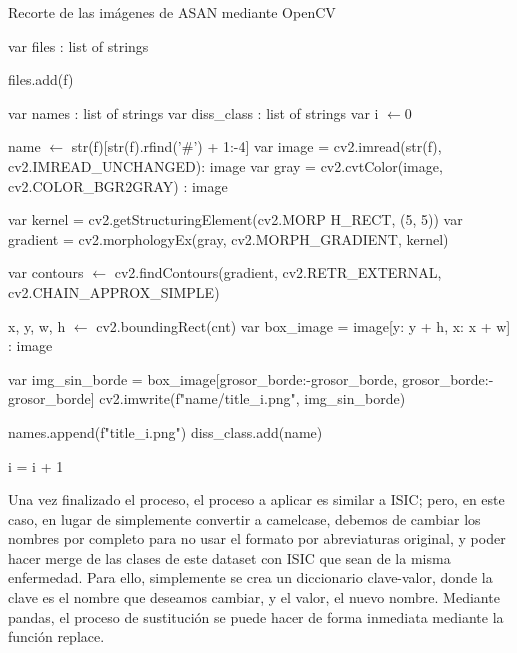 \begin{algorithm}[H]
		\label{cortarasan}
		\caption{Recorte de las imágenes de ASAN mediante OpenCV}
		\begin{algorithmic}
			\State var files : list of strings
			
			 	 \If {f is\_file()]}
			 	 	\State files.add(f)
			 	 \EndIf
			 \EndFor
			 	 
			\State var names : list of strings
			\State var  diss\_class : list of strings
			 \State var i $\gets 0$
			
				   \State name $\gets$ str(f)[str(f).rfind('\#') + 1:-4]
						\State var image = cv2.imread(str(f), cv2.IMREAD\_UNCHANGED): image
						\State var gray = cv2.cvtColor(image, cv2.COLOR\_BGR2GRAY) : image
			
						\State var kernel = cv2.getStructuringElement(cv2.MORP H\_RECT, (5, 5))
						\State var gradient = cv2.morphologyEx(gray, cv2.MORPH\_GRADIENT, kernel)
			
						\State var contours $\gets$ cv2.findContours(gradient, cv2.RETR\_EXTERNAL, cv2.CHAIN\_APPROX\_SIMPLE)
			
								\State	x, y, w, h  $\gets$ cv2.boundingRect(cnt)
								\State var box\_image = image[y: y + h, x: x + w] : image
				
								\State var img\_sin\_borde = box\_image[grosor\_borde:-grosor\_borde, grosor\_borde:-grosor\_borde]
								\State cv2.imwrite(f"{name}/{title}\_{i}.png", img\_sin\_borde)
					
								\State names.append(f"{title}\_{i}.png")
								\State diss\_class.add(name)
								
								\State i = i + 1
						 \EndFor
				\EndIf	 
	\EndFor
				
\EndProcedure
\end{algorithmic}
\end{algorithm}

Una vez finalizado el proceso, el proceso a aplicar es similar a ISIC; pero, en este caso, en lugar de simplemente convertir a camelcase, debemos de cambiar los nombres por completo para no usar el formato por abreviaturas original, y poder hacer merge de las clases de este dataset con ISIC que sean de la misma enfermedad. Para ello, simplemente se crea un diccionario clave-valor, donde la clave es el nombre que deseamos cambiar, y el valor, el nuevo nombre. Mediante pandas, el proceso de sustitución se puede hacer de forma inmediata mediante la función replace.

